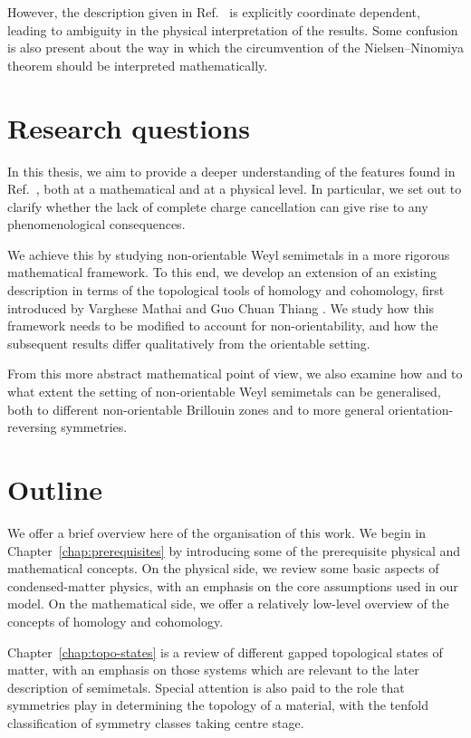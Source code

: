 However, the description given in Ref.~\cite{Fonseca-Vaidya_nonorientable} is explicitly coordinate dependent, leading to ambiguity in the physical interpretation of the results. Some confusion is also present about the way in which the circumvention of the Nielsen--Ninomiya theorem should be interpreted mathematically.

\section{Research questions}

In this thesis, we aim to provide a deeper understanding of the features found in Ref.~\cite{Fonseca-Vaidya_nonorientable}, both at a mathematical and at a physical level. In particular, we set out to clarify whether the lack of complete charge cancellation can give rise to any phenomenological consequences.

We achieve this by studying non-orientable Weyl semimetals in a more rigorous mathematical framework. To this end, we develop an extension of an existing description in terms of the topological tools of homology and cohomology, first introduced by Varghese Mathai and Guo Chuan Thiang \cite{Mathai_math-review,Mathai_math-paper}. We study how this framework needs to be modified to account for non-orientability, and how the subsequent results differ qualitatively from the orientable setting.

From this more abstract mathematical point of view, we also examine how and to what extent the setting of non-orientable Weyl semimetals can be generalised, both to different non-orientable Brillouin zones and to more general orientation-reversing symmetries.

\section{Outline}

We offer a brief overview here of the organisation of this work. We begin in Chapter~\ref{chap:prerequisites} by introducing some of the prerequisite physical and mathematical concepts. On the physical side, we review some basic aspects of condensed-matter physics, with an emphasis on the core assumptions used in our model. On the mathematical side, we offer a relatively low-level overview of the concepts of homology and cohomology.

Chapter~\ref{chap:topo-states} is a review of different gapped topological states of matter, with an emphasis on those systems which are relevant to the later description of semimetals. Special attention is also paid to the role that symmetries play in determining the topology of a material, with the tenfold classification of symmetry classes taking centre stage.

